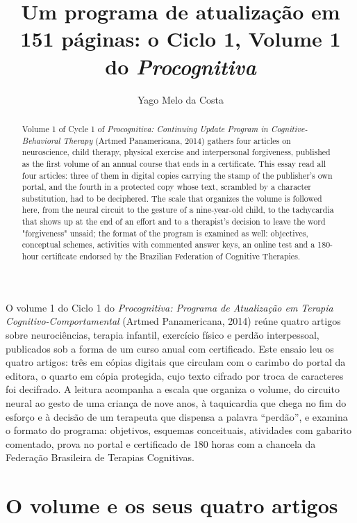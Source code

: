 \documentclass[12pt]{article}
\title{Um programa de atualização em 151 páginas: o Ciclo 1, Volume 1 do \emph{Procognitiva}}
\author{Yago Melo da Costa}
\begin{document}
\maketitle

\begin{resumo}
O volume 1 do Ciclo 1 do \emph{Procognitiva: Programa de Atualização em Terapia Cognitivo-Comportamental} (Artmed Panamericana, 2014) reúne quatro artigos sobre neurociências, terapia infantil, exercício físico e perdão interpessoal, publicados sob a forma de um curso anual com certificado. Este ensaio leu os quatro artigos: três em cópias digitais que circulam com o carimbo do portal da editora, o quarto em cópia protegida, cujo texto cifrado por troca de caracteres foi decifrado. A leitura acompanha a escala que organiza o volume, do circuito neural ao gesto de uma criança de nove anos, à taquicardia que chega no fim do esforço e à decisão de um terapeuta que dispensa a palavra ``perdão'', e examina o formato do programa: objetivos, esquemas conceituais, atividades com gabarito comentado, prova no portal e certificado de 180 horas com a chancela da Federação Brasileira de Terapias Cognitivas.
\end{resumo}

\begin{abstract}
Volume 1 of Cycle 1 of \emph{Procognitiva: Continuing Update Program in Cognitive-Behavioral Therapy} (Artmed Panamericana, 2014) gathers four articles on neuroscience, child therapy, physical exercise and interpersonal forgiveness, published as the first volume of an annual course that ends in a certificate. This essay read all four articles: three of them in digital copies carrying the stamp of the publisher's own portal, and the fourth in a protected copy whose text, scrambled by a character substitution, had to be deciphered. The scale that organizes the volume is followed here, from the neural circuit to the gesture of a nine-year-old child, to the tachycardia that shows up at the end of an effort and to a therapist's decision to leave the word "forgiveness" unsaid; the format of the program is examined as well: objectives, conceptual schemes, activities with commented answer keys, an online test and a 180-hour certificate endorsed by the Brazilian Federation of Cognitive Therapies.
\end{abstract}

\section{O volume e os seus quatro artigos}
\end{document}
